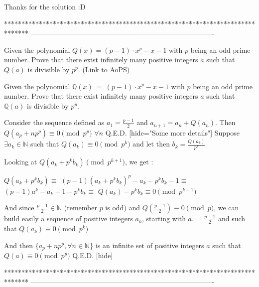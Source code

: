 \begin{solution}
	Thanks for the solution  :D
\end{solution}
*******************************************************************************
-------------------------------------------------------------------------------

\begin{problem}
	Given the polynomial $ {Q} (x) =  (p-1) \cdot x^{p} - x -1 $ with $p$ being an odd prime number. Prove that there exist infinitely many positive integers $a$ such that ${Q}(a)$ is divisible by $p^p$.
	\flushright \href{https://artofproblemsolving.com/community/c6h347397}{(Link to AoPS)}
\end{problem}



\begin{solution}
	\begin{tcolorbox}\begin{italicized}Given the polynomial $ \mathbb{Q} (x) \ = \  (p-1) \cdot x^{p} - x -1 $ with $p$ being an odd prime number. Prove that there exist infinitely
many positive integers $a$ such that $\mathbb{Q}(a)$ is divisible by $p^p$.\end{italicized}\end{tcolorbox}

Consider the sequence defined as $a_1=\frac{p-1}2$ and $a_{n+1}=a_n+Q(a_n)$. Then $Q(a_p+np^p)\equiv 0\pmod{p^p}$ $\forall n$
Q.E.D.
[hide="Some more details"]
Suppose $\exists a_k\in\mathbb N$ such that $Q(a_k)\equiv 0\pmod{p^k}$ and let then $b_k=\frac{Q(a_k)}{p^k}$

Looking at $Q(a_k+p^kb_k)\pmod{p^{k+1}}$, we get :

$Q(a_k+p^kb_k)\equiv$ $(p-1)(a_k+p^kb_k)^p-a_k-p^kb_k-1\equiv$ $(p-1)a^k-a_k-1-p^kb_k\equiv$ $Q(a_k)-p^kb_k\equiv 0\pmod{p^{k+1}}$

And since $\frac{p-1}2\in\mathbb N$ (remember $p$ is odd) and $Q(\frac{p-1}2)\equiv 0\pmod p$, we can build easily a sequence of positive integers $a_k$, starting with $a_1=\frac{p-1}2$ and such that $Q(a_k)\equiv 0\pmod{p^k}$

And then $\{a_p+np^p,\forall n\in\mathbb N\}$ is an infinite set of positive integers $a$ such that $Q(a)\equiv 0\pmod {p^p}$
Q.E.D.
[\/hide]
\end{solution}
*******************************************************************************
-------------------------------------------------------------------------------

